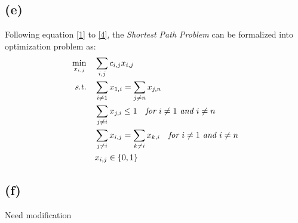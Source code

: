 \documentclass[10pt,a4paper]{article}
\begin{document}
\subsection*{(e)}
Following equation \ref{1} to \ref{4}, the \textit{Shortest Path Problem} can be formalized into optimization problem as:
\begin{equation}
	\begin{aligned}
		\displaystyle\min_{x_{i,j}} \quad & \displaystyle\sum_{i, j} c_{i, j} x_{i, j} \\
		\textsl{s.t.} \quad & \displaystyle\sum_{i \neq 1} x_{1, i} = \displaystyle\sum_{j \neq n}x_{j, n} \\
		& \displaystyle\sum_{j \neq i}x_{j, i} \leq 1 \quad \textit{for } i \neq 1 \textit{ and } i \neq n \\
		& \displaystyle\sum_{j \neq i}x_{i, j} = \displaystyle\sum_{k \neq i}x_{k, i} \quad \textit{for } i \neq 1 \textit{ and } i \neq n \\
		& x_{i, j} \in \{ 0, 1 \}
	\end{aligned}
\end{equation}

\subsection*{(f)}
Need modification
\end{document}
